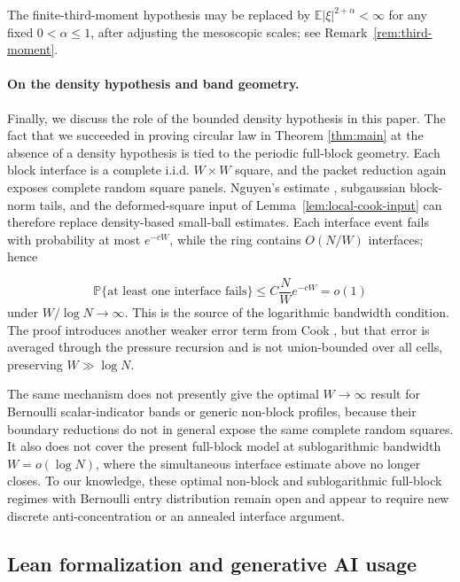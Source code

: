 \documentclass[11pt,reqno]{amsart}
\numberwithin{equation}{section}
\theoremstyle{definition}
\theoremstyle{remark}
\newcommand{\E}{\mathbb E}
\newcommand{\1}{\mathbf 1}
\renewcommand{\P}{\mathbb P}
\begin{document}
\medskip\noindent
The finite-third-moment hypothesis may be replaced by
\(\E|\xi|^{2+\alpha}<\infty\) for any fixed \(0<\alpha\le1\), after
adjusting the mesoscopic scales; see Remark~\ref{rem:third-moment}.


\medskip\noindent
\paragraph{On the density hypothesis and band geometry.} Finally, we discuss the role of the bounded density hypothesis in this paper. The fact that we succeeded in proving circular law in Theorem \ref{thm:main} at the absence of a density hypothesis is tied to the periodic full-block
geometry.  Each block interface is a complete i.i.d. \(W\times W\) square,
and the packet reduction again exposes complete random square panels.
Nguyen's estimate \cite{Nguyen}, subgaussian block-norm tails, and the deformed-square
input of Lemma~\ref{lem:local-cook-input} can therefore replace
density-based small-ball estimates.  Each interface event fails with probability at most
\(e^{-cW}\), while the ring contains \(O(N/W)\) interfaces; hence

\[
 \P\{\text{at least one interface fails}\}
 \leq C\frac{N}{W}e^{-cW}=o(1)
\]
under \(W/\log N\to\infty\).  This is the source of the logarithmic
bandwidth condition.  The proof introduces another weaker error term from Cook \cite{Cook}, but that error is averaged through
the pressure recursion and is not union-bounded over all cells, preserving $W\gg \log N$.

The same mechanism does not presently give the optimal \(W\to\infty\)
result for Bernoulli scalar-indicator bands or generic non-block
profiles, because their boundary reductions do not in general expose the
same complete random squares.  It also does not cover the present full-block
model at sublogarithmic bandwidth \(W=o(\log N)\), where the simultaneous
interface estimate above no longer closes.  To our knowledge, these
optimal non-block and sublogarithmic full-block regimes with Bernoulli entry distribution remain open and
appear to require new discrete anti-concentration or an annealed interface
argument.




\subsection{Lean formalization and generative AI usage}\label{subsec:lean-verification}
\end{document}
